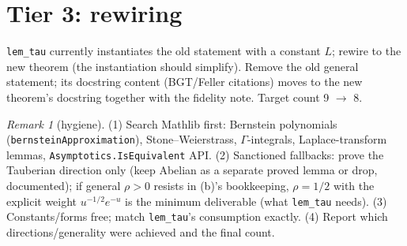 \documentclass[11pt]{article}
\theoremstyle{plain}
\theoremstyle{remark}
\newtheorem{remark}{Remark}
\begin{document}
\section*{Tier 3: rewiring}

\texttt{lem\_tau} currently instantiates the old statement with a constant
$L$; rewire to the new theorem (the instantiation should simplify). Remove the
old general statement; its docstring content (BGT/Feller citations) moves to
the new theorem's docstring together with the fidelity note. Target count
9 $\to$ 8.

\begin{remark}[hygiene]
(1) Search Mathlib first: Bernstein polynomials
(\texttt{bernsteinApproximation}), Stone--Weierstrass, $\Gamma$-integrals,
Laplace-transform lemmas, \texttt{Asymptotics.IsEquivalent} API.
(2) Sanctioned fallbacks: prove the Tauberian direction only (keep Abelian as
a separate proved lemma or drop, documented); if general $\rho>0$ resists in
(b)'s bookkeeping, $\rho=1/2$ with the explicit weight
$u^{-1/2}e^{-u}$ is the minimum deliverable (what \texttt{lem\_tau} needs).
(3) Constants/forms free; match \texttt{lem\_tau}'s consumption exactly.
(4) Report which directions/generality were achieved and the final count.
\end{remark}
\end{document}
